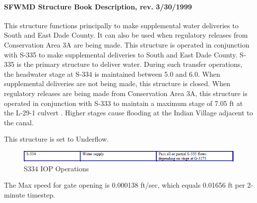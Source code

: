 \paragraph{SFWMD Structure Book Description, rev. 3/30/1999}
This structure functions principally to make supplemental water deliveries to South and East Dade County.
It can also be used when regulatory releases from Conservation Area 3A are being made.
This structure is operated in conjunction with S-335 to make supplemental deliveries to South and East Dade County.
S-335 is the primary structure to deliver water.
During such transfer operations, the headwater stage at S-334 is maintained between 5.0 and 6.0.
When supplemental deliveries are not being made, this structure is closed.
When regulatory releases are being made from Conservation Area 3A, this structure is operated in conjunction with S-333 to maintain a maximum stage of 7.05 ft at the L-29-1 culvert \cite{corp2005, SFWMD1994}.
Higher stages cause flooding at the Indian Village adjacent to the canal.

This structure is set to Underflow.


\begin{figure}[!h]
  \begin{center}
  \includegraphics[width=6.5in]{../figs/S334_IOPops.png}
  \caption{S334 IOP Operations}
  \label{fig:S334iop}
  \end{center}
\end{figure}

The Max speed for gate opening is 0.000138 ft/sec, which equals 0.01656 ft per 2-minute timestep.

